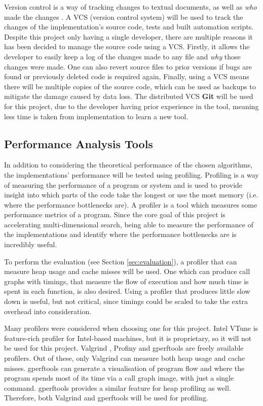 Version control is a way of tracking changes to textual documents, as well as \textit{who} made the changes \cite{pragmatic-version-control}. A VCS (version control system) will be used to track the changes of the implementation's source code, tests and built automation scripts. Despite this project only having a single developer, there are multiple reasons it has been decided to manage the source code using a VCS. Firstly, it allows the developer to easily keep a log of the changes made to any file and \textit{why} those changes were made. One can also revert source files to prior versions if bugs are found or previously deleted code is required again, Finally, using a VCS means there will be multiple copies of the source code, which can be used as backups to mitigate the damage caused by data loss. The distributed VCS \textbf{Git} \cite{git} will be used for this project, due to the developer having prior experience in the tool, meaning less time is taken from implementation to learn a new tool.

\subsection{Performance Analysis Tools}

In addition to considering the theoretical performance of the chosen algorithms, the implementations' performance will be tested using profiling. Profiling is a way of measuring the performance of a program or system \cite{efficient-cpp} and is used to provide insight into which parts of the code take the longest or use the most memory (i.e. where the performance bottlenecks are). A profiler is a tool which measures some performance metrics of a program. Since the core goal of this project is accelerating multi-dimensional search, being able to measure the performance of the implementations and identify where the performance bottlenecks are is incredibly useful.

To perform the evaluation (see Section \ref{sec:evaluation}), a profiler that can measure heap usage and cache misses will be used. One which can produce call graphs with timings, that measure the flow of execution and how much time is spent in each function, is also desired. Using a profiler that produces little slow down is useful, but not critical, since timings could be scaled to take the extra overhead into consideration. 

Many profilers were considered when choosing one for this project. Intel VTune \cite{intel-vtune} is feature-rich profiler for Intel-based machines, but it is proprietary, so it will not be used for this project. Valgrind \cite{valgrind}, Profiny \cite{profiny} and gperftools \cite{gperftools} are freely available profilers. Out of these, only Valgrind can measure both heap usage and cache misses. gperftools can generate a visualisation of program flow and where the program spends most of its time via a call graph image, with just a single command. gperftools provides a similar feature for heap profiling as well. Therefore, both Valgrind and gperftools will be used for profiling.


